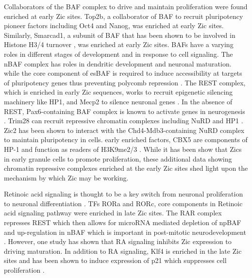 \documentclass[fleqn,10pt]{wlscirep}
\begin{document}
Collaborators of the BAF complex to drive and maintain proliferation were found enriched at early Zic sites. Top2b, a collaborator of BAF to recruit pluripotency pioneer factors including Oct4 and Nanog, was enriched at early Zic sites. Similarly,  Smarcad1, a subunit of BAF that has been shown to be involved in Histone H3/4 turnover \cite{Markert2021Smarcad1Activity}, was  enriched at early Zic sites. BAFs have a varying roles in different stages of development and in response to cell signaling. The nBAF complex has roles in dendritic development and neuronal maturation. \cite{Alfert2019TheDisease} while the core component of esBAF is required to induce accessibility at targets of pluripotency genes thus preventing polycomb repression \cite{Ho2011EsBAFFunction}. The REST complex, which is enriched in early Zic sequences, works to recruit epigenetic silencing machinery like HP1, and Mecp2 to silence neuronal genes \cite{Ballas2005TheGenes}. In the absence of REST, Pax6-containing BAF complex is known to activate genes in neurogenesis \cite{Ninkovic2013TheNetwork, Tuoc2013ChromatinThickness}. Trim28 can recruit repressive chromatin complexes including NuRD and HP1 \cite{Sripathy2006TheRepression}. Zic2 has been shown to interact with the Chd4-Mdb3-containing NuRD complex to maintain pluripotency in cells\cite{Luo2015Zic2Specification}. early enriched factors, CBX5 are components of HP-1 and function as readers of H3K9me2/3 \cite{vanWijnen2021BiologicalDevelopment}. While it has been show that Zics in early granule cells to promote proliferation, these additional data showing chromatin repressive complexes enriched at the early Zic sites shed light upon the mechanism by which Zic may be working. 



Retinoic acid signaling is thought to be a key switch from neuronal proliferation to neuronal differentiation \cite{Janesick2015RetinoicDifferentiation}. TFs RORa and RORc, core components in Retinoic acid signaling pathway were enriched in late Zic sites. The RAR complex represses REST which then allows for microRNA mediated depletion of npBAF and up-regulation in nBAF which is important in post-mitotic neurodevelopment \cite{Alfert2019TheDisease}. However, one study has shown that RA signaling inhibits Zic expression \cite{Janesick2013ERFNeurogenesis} to driving maturation. In addition to RA signaling, Klf4 is enriched in the late Zic sites and has been shown to induce expression of p21 which suppresses cell proliferation \cite{Zhang2000ThePromoter}. 
\end{document}
